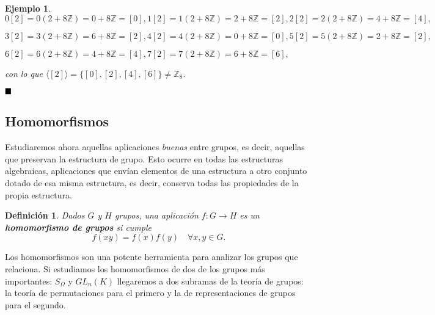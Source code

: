 \documentclass[12pt]{article}
\newtheorem{definition}[theorem]{Definición}
\newtheorem{example}{Ejemplo}[theorem]
\begin{document}
\begin{example}
$0\left[ 2 \right] = 0(2 + 8\mathbb{Z}) = 0 +8\mathbb{Z} = \left[ 0 \right],1\left[ 2 \right] = 1(2 + 8\mathbb{Z}) = 2 +8\mathbb{Z} = \left[ 2 \right],2\left[ 2 \right] = 2(2 + 8\mathbb{Z}) = 4 +8\mathbb{Z} = \left[ 4 \right],$

$3\left[ 2 \right] = 3(2 + 8\mathbb{Z}) = 6 +8\mathbb{Z} = \left[ 2 \right],4\left[ 2 \right] = 4(2 + 8\mathbb{Z}) = 0 +8\mathbb{Z} = \left[ 0 \right], 5\left[ 2 \right] = 5(2 + 8\mathbb{Z}) = 2 +8\mathbb{Z} = \left[ 2 \right],$

$6\left[ 2 \right] = 6(2 + 8\mathbb{Z}) = 4 +8\mathbb{Z} = \left[ 4 \right], 7\left[ 2 \right] = 7(2 + 8\mathbb{Z}) = 6 +8\mathbb{Z} = \left[ 6 \right],$

con lo que $\langle \left[ 2 \right] \rangle = \lbrace \left[ 0 \right], \left[ 2 \right], \left[ 4 \right], \left[ 6 \right] \rbrace \neq \mathbb{Z}_{8}$.
\end{example}

$\hfill \blacksquare$

\subsection{Homomorfismos}

Estudiaremos ahora aquellas aplicaciones \textit{buenas} entre grupos, es decir, aquellas que preservan la estructura de grupo. Esto ocurre en todas las estructuras algebraicas, aplicaciones que envían elementos de una estructura a otro conjunto dotado de esa misma estructura, es decir, conserva todas las propiedades de la propia estructura.

\begin{definition}Dados $G$ y $H$ grupos, una aplicación $f \colon G \longrightarrow H$ es un \textbf{homomorfismo de grupos} si cumple $$f(xy) = f(x)f(y) \quad \forall x,y \in G.$$
\end{definition}

Los homomorfismos son una potente herramienta para analizar los grupos que relaciona. Si estudiamos los homomorfismos de dos de los grupos más importantes: $S_{\Omega}$ y $GL_n(K)$ llegaremos a dos subramas de la teoría de grupos: la teoría de permutaciones para el primero y la de representaciones de grupos para el segundo.
\end{document}
